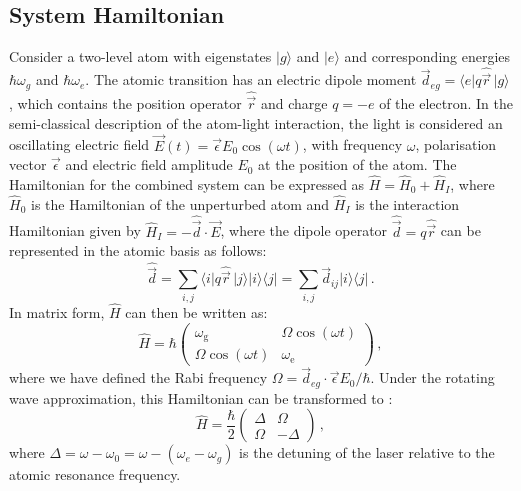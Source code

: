 \documentclass[../Thesis-IJspeert.tex]{subfiles}
\begin{document}
\subsection{System Hamiltonian}
\label{subsection_System_Hamiltonian}
Consider a two-level atom with eigenstates $\vert g \rangle$ and $\vert e \rangle$ and corresponding energies $\hbar\omega_{g}$ and $\hbar\omega_{e}$. The atomic transition has an electric dipole moment $\vec{d}_{eg}=\langle e \vert q \hat{\vec{r}} \,\vert g \rangle$, which contains the position operator $\hat{\vec{r}}$ and charge $q=-e$ of the electron. In the semi-classical description of the atom-light interaction, the light is considered an oscillating electric field $\vec{E}(t)=\vec{\epsilon}E_0\cos \left(\omega t\right)$, with frequency $\omega$, polarisation vector $\vec{\epsilon}$ and electric field amplitude $E_0$ at the position of the atom. The Hamiltonian for the combined system can be expressed as $\hat{H}=\hat{H}_0+\hat{H}_I$, where $\hat{H}_0$ is the Hamiltonian of the unperturbed atom and $\hat{H}_I$ is the interaction Hamiltonian given by $\hat{H}_I=-\hat{\vec{d}}\cdot \vec{E}$, where the dipole operator $\hat{\vec{d}}=q\hat{\vec{r}}$ can be represented in the atomic basis as follows:
\begin{equation}
\hat{\vec{d}}=\sum_{i,j} \langle i \vert q \hat{\vec{r}}\, \vert j \rangle \vert i \rangle \langle j \vert  = \sum_{i,j} \vec{d}_{ij} \vert  i \rangle \langle j \vert\,.
\end{equation}
In matrix form, $\hat{H}$ can then be written as:
\begin{equation}
\label{hamiltonian1}
\hat{H}=\hbar
\begin{pmatrix} 
\omega_\text{g} & \Omega\cos(\omega t)\\
\Omega\cos(\omega t) & \omega_\text{e}
\end{pmatrix}
\,,
\end{equation}
where we have defined the Rabi frequency $\Omega=\vec{d}_{eg}\cdot\vec{\epsilon}E_0/\hbar$. Under the rotating wave approximation, this Hamiltonian can be transformed to \cite{loudon}:
\begin{equation}
\label{timeindependentH}
\hat{H}=\frac{\hbar}{2}
\begin{pmatrix} 
\Delta& \Omega\\
\Omega& -\Delta
\end{pmatrix}\,,
\end{equation}
where $\Delta=\omega-\omega_0=\omega-\left(\omega_e-\omega_g\right)$ is the detuning of the laser relative to the atomic resonance frequency.
\end{document}
